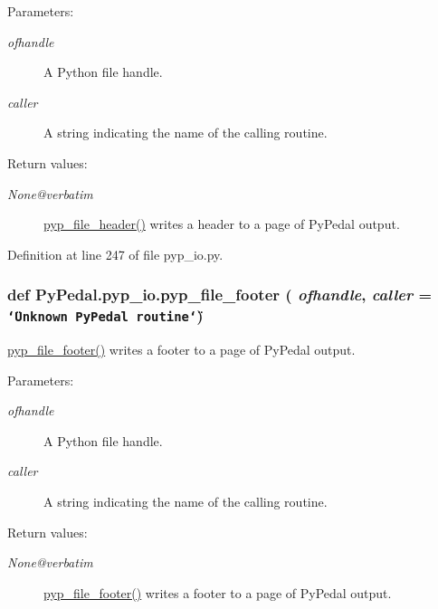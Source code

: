 \begin{Desc}
\item[Parameters:]
\begin{description}
\item[{\em ofhandle}]A Python file handle. \item[{\em caller}]A string indicating the name of the calling routine. \end{description}
\end{Desc}
\begin{Desc}
\item[Return values:]
\begin{description}
\item[{\em None@verbatim}]\hyperlink{namespacePyPedal_1_1pyp__io_3e7555b76911d21bcbc6c0e64c653f42}{pyp\_\-file\_\-header()} writes a header to a page of Py\-Pedal output.  \end{description}
\end{Desc}


Definition at line 247 of file pyp\_\-io.py.\hypertarget{namespacePyPedal_1_1pyp__io_d0d3a34b6a9d9c2a5ab2d9f4f9316e70}{
\subsubsection[pyp\_\-file\_\-footer]{\setlength{\rightskip}{0pt plus 5cm}def Py\-Pedal.pyp\_\-io.pyp\_\-file\_\-footer ( {\em ofhandle},  {\em caller} = {\tt \char`\"{}Unknown~PyPedal~routine\char`\"{}})}}
\label{namespacePyPedal_1_1pyp__io_d0d3a34b6a9d9c2a5ab2d9f4f9316e70}


\hyperlink{namespacePyPedal_1_1pyp__io_d0d3a34b6a9d9c2a5ab2d9f4f9316e70}{pyp\_\-file\_\-footer()} writes a footer to a page of Py\-Pedal output. 

\begin{Desc}
\item[Parameters:]
\begin{description}
\item[{\em ofhandle}]A Python file handle. \item[{\em caller}]A string indicating the name of the calling routine. \end{description}
\end{Desc}
\begin{Desc}
\item[Return values:]
\begin{description}
\item[{\em None@verbatim}]\hyperlink{namespacePyPedal_1_1pyp__io_d0d3a34b6a9d9c2a5ab2d9f4f9316e70}{pyp\_\-file\_\-footer()} writes a footer to a page of Py\-Pedal output.  \end{description}
\end{Desc}


